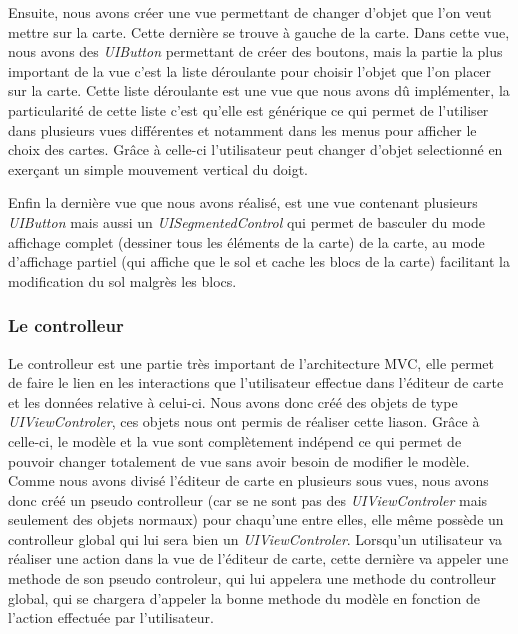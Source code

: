 		\begin{center}
		\end{center}
			
		Ensuite, nous avons créer une vue permettant de changer d'objet que l'on veut mettre sur la carte. Cette dernière se trouve à gauche de la carte. Dans cette vue, nous avons des \textit{UIButton} permettant de créer des boutons, mais la partie la plus important de la vue c'est la liste déroulante pour choisir l'objet que l'on placer sur la carte. Cette liste déroulante est une vue que nous avons dû implémenter, la particularité de cette liste c'est qu'elle est générique ce qui permet de l'utiliser dans plusieurs vues différentes et notamment dans les menus pour afficher le choix des cartes. Grâce à celle-ci l'utilisateur peut changer d'objet selectionné en exerçant un simple mouvement vertical du doigt.
			
		\begin{center}
		\end{center}
		Enfin la dernière vue que nous avons réalisé, est une vue contenant plusieurs \textit{UIButton} mais aussi un \textit{UISegmentedControl} qui permet de basculer du mode affichage complet (dessiner tous les éléments de la carte) de la carte, au mode d'affichage partiel (qui affiche que le sol et cache les blocs de la carte) facilitant la modification du sol malgrès les blocs.
			
			
	\subsubsection{Le controlleur}
		
		Le controlleur est une partie très important de l'architecture MVC, elle permet de faire le lien en les interactions que l'utilisateur effectue dans l'éditeur de carte et les données relative à celui-ci. Nous avons  donc créé des objets de type \textit{UIViewControler}, ces objets nous ont permis de réaliser cette liason. Grâce à celle-ci, le modèle et la vue sont complètement indépend ce qui permet de pouvoir changer totalement de vue sans avoir besoin de modifier le modèle. Comme nous avons divisé l'éditeur de carte en plusieurs sous vues, nous avons donc créé un \og pseudo \fg controlleur (car se ne sont pas des \textit{UIViewControler} mais seulement des objets normaux) pour chaqu'une entre elles, elle même possède un controlleur global qui lui sera bien un \textit{UIViewControler}. Lorsqu'un utilisateur va réaliser une action dans la vue de l'éditeur de carte, cette dernière va appeler une methode de son pseudo controleur, qui lui appelera une methode du controlleur global, qui se chargera d'appeler la bonne methode du modèle en fonction de l'action effectuée par l'utilisateur. 




